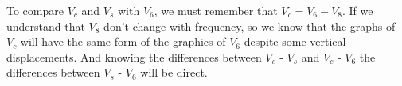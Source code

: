 To compare $V_c$ and $V_s$ with $V_6$, we must remember that $V_c = V_6-V_8$. If we understand that $V_8$ don't change with frequency, so we know that the graphs of
 $V_c$ will have the same form of the graphics of $V_6$ despite some vertical displacements. And knowing the differences between $V_c$ - $V_s$ and $V_c$ - $V_6$
the differences between $V_s$ - $V_6$ will be direct.



